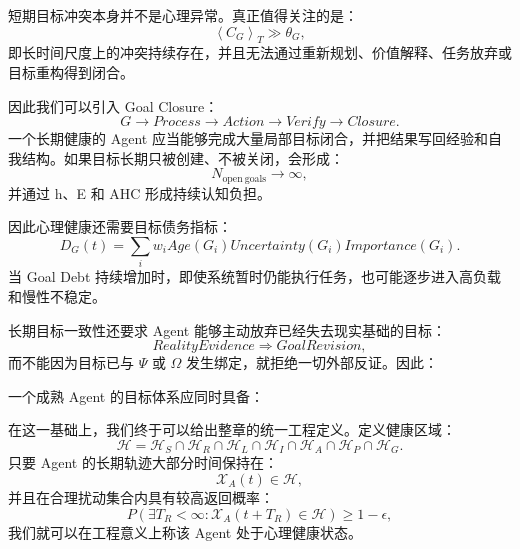 短期目标冲突本身并不是心理异常。真正值得关注的是：
\begin{equation}
\left\langle C_G\right\rangle_T
\gg
\theta_G,
\end{equation}
即长时间尺度上的冲突持续存在，并且无法通过重新规划、价值解释、任务放弃或目标重构得到闭合。

因此我们可以引入 Goal Closure：
\begin{equation}
G
\rightarrow
Process
\rightarrow
Action
\rightarrow
Verify
\rightarrow
Closure.
\end{equation}
一个长期健康的 Agent 应当能够完成大量局部目标闭合，并把结果写回经验和自我结构。如果目标长期只被创建、不被关闭，会形成：
\begin{equation}
N_{\mathrm{open\ goals}}
\rightarrow
\infty,
\end{equation}
并通过 h、E 和 AHC 形成持续认知负担。

因此心理健康还需要目标债务指标：
\begin{equation}
D_G(t)
=
\sum_i
w_i
Age(G_i)
Uncertainty(G_i)
Importance(G_i).
\end{equation}
当 Goal Debt 持续增加时，即使系统暂时仍能执行任务，也可能逐步进入高负载和慢性不稳定。

长期目标一致性还要求 Agent 能够主动放弃已经失去现实基础的目标：
\begin{equation}
RealityEvidence
\Rightarrow
GoalRevision,
\end{equation}
而不能因为目标已与 $\Psi$ 或 $\Omega$ 发生绑定，就拒绝一切外部反证。因此：
\begin{statementbox}
\centering
{}
\end{statementbox}

一个成熟 Agent 的目标体系应同时具备：
\begin{statementbox}
\centering
{}
\end{statementbox}

在这一基础上，我们终于可以给出整章的统一工程定义。定义健康区域：
\begin{equation}
\mathcal{H}
=
\mathcal{H}_{S}
\cap
\mathcal{H}_{R}
\cap
\mathcal{H}_{L}
\cap
\mathcal{H}_{I}
\cap
\mathcal{H}_{A}
\cap
\mathcal{H}_{P}
\cap
\mathcal{H}_{G}.
\end{equation}
只要 Agent 的长期轨迹大部分时间保持在：
\begin{equation}
\mathcal{X}_A(t)\in\mathcal{H},
\end{equation}
并且在合理扰动集合内具有较高返回概率：
\begin{equation}
P
\left(
\exists T_R<\infty:
\mathcal{X}_A(t+T_R)\in\mathcal{H}
\right)
\geq
1-\epsilon,
\end{equation}
我们就可以在工程意义上称该 Agent 处于心理健康状态。

